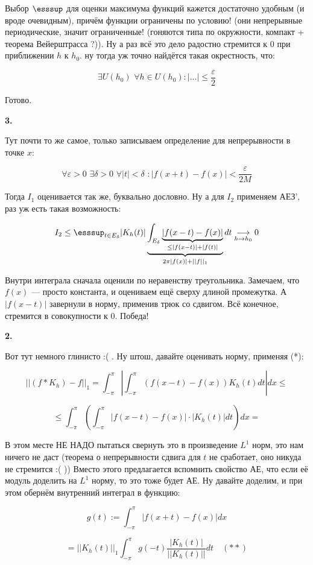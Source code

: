 \documentclass{article}
\def\dbl{\,\,}
\def\goesto#1{\underset{#1}{\longrightarrow}}
\begin{document}
Выбор $\esssup$ для оценки максимума функций кажется достаточно удобным (и вроде очевидным), причём функции ограничены по условию! (они непрерывные периодические, значит ограниченные! (гоняются типа по окружности, компакт + теорема Вейерштрасса ?)). Ну а раз всё это дело радостно стремится к 0 при приближении $h$ к $h_0$. ну тогда уж точно найдётся такая окрестность, что:

\[\exists U(h_0) \dbl \forall h \in U(h_0): |\ldots| \le \frac{\varepsilon}{2}\]

Готово.

\textbf{3. }

Тут почти то же самое, только записываем определение для непрерывности в точке $x$:

\[\forall \varepsilon > 0 \dbl \exists \delta > 0 \dbl \forall |t| < \delta \dbl : |f(x + t) - f(x)| < \frac{\varepsilon}{2M}\]

Тогда $I_1$ оценивается так же, буквально дословно. Ну а для $I_2$ применяем АЕЗ', раз уж есть такая возможность:

\[I_2 \le \esssup_{t \in E_\delta}|K_h(t)| \underbrace{\int_{E_\delta} \underbrace{|f(x - t) - f(x)|}_{\le |f(x - t)| + |f(t)|}}_{2\pi|f(x)| + ||f||_1} dt  \goesto{h \rightarrow h_0} 0\]

Внутри интеграла сначала оценили по неравенству треугольника. Замечаем, что $f(x)$ --- просто константа, и оцениваем ещё сверху длиной промежутка. А $|f(x - t)|$ завернули в норму, применив трюк со сдвигом. Всё конечное, стремится в совокупности к 0. Победа!

\textbf{2. }

Вот тут немного глинисто :( . Ну штош, давайте оценивать норму, применяя (*):

\[||(f * K_h) - f||_1 = \int_{-\pi}^{\pi} \left| \int_{-\pi}^{\pi} (f(x - t) - f(x))K_h(t) dt\right| dx \le \] 

\[ \le \int_{-\pi}^{\pi} \left(\int_{-\pi}^{\pi} |f(x - t) - f(x)| \cdot |K_h(t)| dt \right)dx = \]

В этом месте НЕ НАДО пытаться свернуть это в произведение $L^1$ норм, это нам ничего не даст (теорема о непрерывности сдвига для $t$ не сработает, оно никуда не стремится :( )) Вместо этого предлагается вспомнить свойство АЕ, что если её модуль доделить на $L^1$ норму, то это тоже будет АЕ. Ну давайте доделим, и при этом обернём внутренний интеграл в функцию:

\[g(t) := \int_{-\pi}^{\pi} |f(x + t) - f(x)| dx\]

\[ = ||K_h(t)||_1\int_{-\pi}^{\pi} g(-t) \frac{|K_h(t)|}{||K_h(t)||}dt \quad (**)\]
\end{document}
